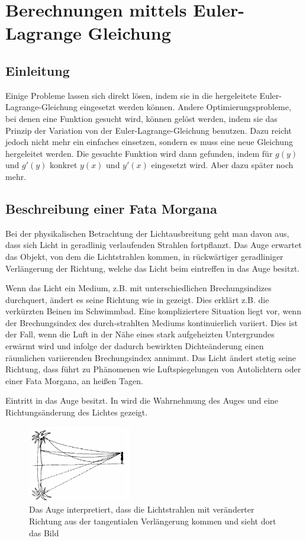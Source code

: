 \section{Berechnungen mittels Euler-Lagrange Gleichung}
\subsection{Einleitung}
Einige Probleme lassen sich direkt lösen, indem sie in die hergeleitete Euler-Lagrange-Gleichung eingesetzt werden können. Andere Optimierungsprobleme, bei denen eine Funktion gesucht wird, können gelöst werden, indem sie das Prinzip der Variation von der Euler-Lagrange-Gleichung benutzen. Dazu reicht jedoch nicht mehr ein einfaches einsetzen, sondern es muss eine neue Gleichung hergeleitet werden. Die gesuchte Funktion wird dann gefunden, indem für $g(y)$ und $g'(y)$ konkret $y(x)$ und $y'(x)$ eingesetzt wird. Aber dazu später noch mehr.

\subsection{Beschreibung einer Fata Morgana}
\cite{fataEinleitung}
Bei der physikalischen Betrachtung der Lichtausbreitung geht man davon aus, dass sich Licht in
geradlinig verlaufenden Strahlen fortpflanzt. Das Auge erwartet das Objekt, von dem die Lichtstrahlen
kommen, in rückwärtiger geradliniger Verlängerung der Richtung, welche das Licht beim eintreffen in das Auge besitzt.

Wenn das Licht ein Medium, z.B. mit unterschiedlichen Brechungsindizes durchquert, ändert es seine Richtung wie in  gezeigt. Dies erklärt z.B. die verkürzten Beinen im Schwimmbad.
Eine kompliziertere Situation liegt vor, wenn der Brechungsindex des durch-strahlten Mediums kontinuierlich variiert. 
Dies ist der Fall, wenn die Luft in der Nähe eines stark aufgeheizten Untergrundes erwärmt
wird und infolge der dadurch bewirkten Dichteänderung einen räumlichen variierenden Brechungsindex annimmt. 
Das Licht ändert stetig seine Richtung, dass führt zu Phänomenen wie Luftspiegelungen von Autolichtern oder einer Fata Morgana, an heißen Tagen.

Eintritt in das Auge besitzt. In  wird die Wahrnehmung des Auges und eine Richtungsänderung des Lichtes gezeigt.

\begin{figure}[H]
	\includegraphics[width=0.4\textwidth]{./picture/FataEinleitung.png}
	\caption{Das Auge interpretiert, dass die Lichtstrahlen mit veränderter Richtung aus der tangentialen Verlängerung kommen und sieht dort das Bild}
	\label{Ab:fataEinleitung}
\end{figure}


